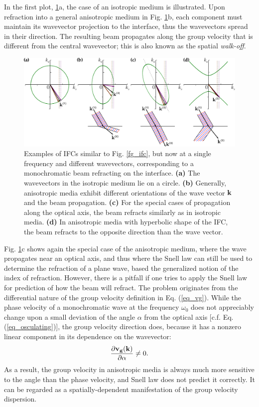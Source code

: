 In the first plot, \ref{fg_ifc2}a, the case of an isotropic medium is illustrated. Upon refraction into a general anisotropic medium in Fig. \ref{fg_ifc2}b, each component must maintain its wavevector projection to the interface, thus the wavevectors spread in their direction. The resulting beam propagates along the group velocity that is different from the central wavevector; %
this is also known as the spatial \textit{walk-off}.
\begin{figure}[ht] \caption{Examples of IFCs similar to Fig. \ref{fg_ifc}, but now at a single frequency and different wavevectors, corresponding to a monochromatic beam refracting on the interface. \textbf{(a)} The wavevectors in the isotropic medium lie on a circle.
		\textbf{(b)} Generally, anisotropic media exhibit different orientations of the wave vector ${\mathbf{k}}$ and the beam propagation. \textbf{(c)} For the special cases of propagation along the optical axis, the beam refracts similarly as in isotropic media.
 \textbf{(d)} In anisotropic media with hyperbolic shape of the IFC, the beam refracts to the opposite direction than the wave vector. } \label{fg_ifc2} \centering 
	\includegraphics[width=\textwidth]{img/ifc_kdispersion_hyp.pdf} 
\end{figure}

Fig. \ref{fg_ifc2}c shows again the special case of the anisotropic medium, where the wave propagates near an optical axis, and thus where the Snell law can still be used to determine the refraction of a plane wave, based the generalized notion of the index of refraction.
However, there is a pitfall if one tries to apply the Snell law for prediction of how the beam will refract. The problem originates from the differential nature of the group velocity definition in Eq. (\ref{eq_vg}). 
While the phase velocity of a monochromatic wave at the frequency $\omega_0$ does not appreciably change upon a small deviation of the angle $\alpha$ from the optical axis  [c.f.  Eq. (\ref{eq_osculating})], the group velocity direction does, because it has a nonzero linear component in its dependence on the wavevector:
$$ \frac{\partial {\mathbf{v_g}}({\mathbf{k}})}{\partial \alpha} \neq 0.$$
As a result, the group velocity in anisotropic media is always much more sensitive to the angle than the phase velocity, and Snell law does not predict it correctly. It can be regarded as a spatially-dependent manifestation of the group velocity dispersion.

